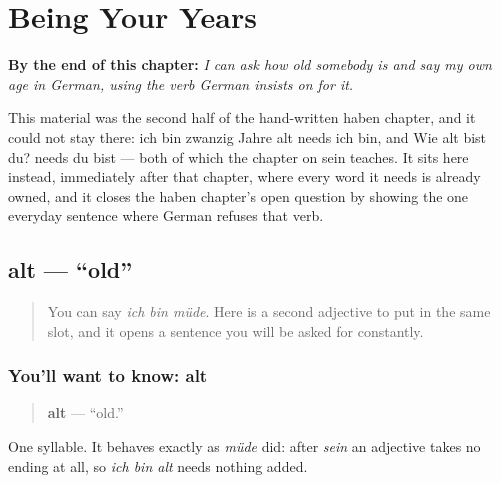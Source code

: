 
\chapter{Being Your Years}
\label{ch:ge-alter}

\begin{chapteropening}
\textbf{By the end of this chapter:} \emph{I can ask how old somebody is and say my own age in German, using the verb German insists on for it.}

This material was the second half of the hand-written haben chapter, and it could not stay there: ich bin zwanzig Jahre alt needs ich bin, and Wie alt bist du? needs du bist — both of which the chapter on sein teaches. It sits here instead, immediately after that chapter, where every word it needs is already owned, and it closes the haben chapter's open question by showing the one everyday sentence where German refuses that verb.
\end{chapteropening}

\section[alt]{alt — \textquotedblleft{}old\textquotedblright{}}

\label{lesson:GE-C14-alt}



\begin{quote}
You can say \emph{ich bin müde}. Here is a second adjective to put in the same slot, and it opens a sentence you will be asked for constantly.
\end{quote}

\subsection*{You'll want to know: alt}
\begin{quote}
\textbf{alt} — \textquotedblleft{}old.\textquotedblright{}
\end{quote}

One syllable. It behaves exactly as \emph{müde} did: after \emph{sein} an adjective takes no ending at all, so \emph{ich bin alt} needs nothing added.

